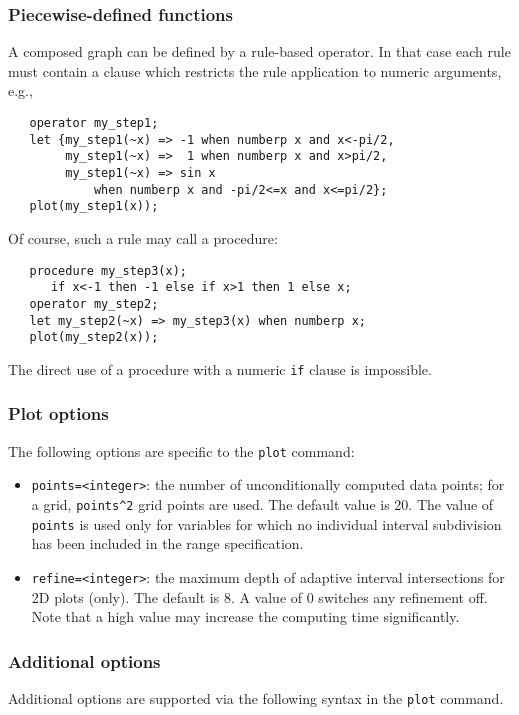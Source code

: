 \subsubsection{Piecewise-defined functions}
A composed graph can be defined by a rule-based operator.  In that case each
rule must contain a clause which restricts the rule application to numeric
arguments, e.g.,
\begin{verbatim}
   operator my_step1;
   let {my_step1(~x) => -1 when numberp x and x<-pi/2,
        my_step1(~x) =>  1 when numberp x and x>pi/2,
        my_step1(~x) => sin x
            when numberp x and -pi/2<=x and x<=pi/2};
   plot(my_step1(x));
\end{verbatim}
Of course, such a rule may call a procedure:
\begin{verbatim}
   procedure my_step3(x);
      if x<-1 then -1 else if x>1 then 1 else x;
   operator my_step2;
   let my_step2(~x) => my_step3(x) when numberp x;
   plot(my_step2(x));
\end{verbatim}
The direct use of a procedure with a numeric \texttt{if} clause is impossible.

\hypertarget{gnuplot:plot-options}{\subsubsection{Plot options}}

The following options are specific to the {\REDUCE} \texttt{plot} command:
\begin{itemize}
   \item \texttt{points=<integer>}: the number of unconditionally
     computed data points; for a grid,
     \texttt{points\textasciicircum2} grid points are used.  The
     default value is 20.  The value of \texttt{points} is used only
     for variables for which no individual interval subdivision has
     been included in the range specification.
   \item \texttt{refine=<integer>}: the maximum depth of adaptive
     interval intersections for 2D plots (only).  The default is 8.  A
     value of 0 switches any refinement off.  Note that a high value
     may increase the computing time significantly.
\end{itemize}

\subsubsection{Additional options}

Additional {\Gnuplot} options are supported via the following
syntax in the \texttt{plot} command.

